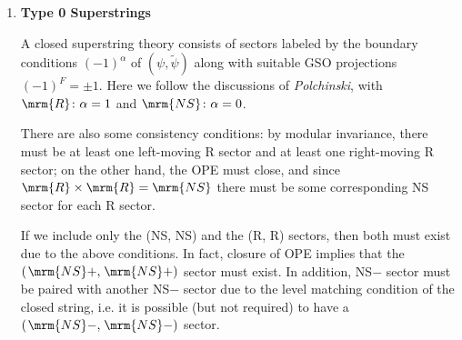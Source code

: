 \documentclass[a4paper,10pt]{article}
\newcommand{\NS}{\ensuremath{\mspace{2mu}\mrm{NS}}}
\begin{document}
\maketitle
\pagestyle{headings}
\thispagestyle{empty}


	\begin{enumerate}
	
	\item \textbf{Type 0 Superstrings}
	
	A closed superstring theory consists of sectors labeled by the boundary conditions $(-1)^\alpha$ of $(\psi,\tilde{\psi})$ along with suitable GSO projections $(-1)^F = \pm 1$. Here we follow the discussions of \textit{Polchinski}, with $\mrm{R}\colon \alpha = 1$ and $\mrm{NS}\colon \alpha = 0$. 
	
	There are also some consistency conditions: by modular invariance, there must be at least one left-moving R sector and at least one right-moving R sector; on the other hand, the OPE must close, and since $\mrm{R} \times \mrm{R} = \mrm{NS}$ there must be some corresponding NS sector for each R sector. 
	
	If we include only the (NS, NS) and the (R, R) sectors, then both must exist due to the above conditions. In fact, closure of OPE implies that the $(\NS+, \NS+)$ sector must exist. In addition, NS$-$ sector must be paired with another NS$-$ sector due to the level matching condition of the closed string, i.e. it is possible (but not required) to have a $(\NS-, \NS-)$ sector. 
	

\end{enumerate}
\end{document}
